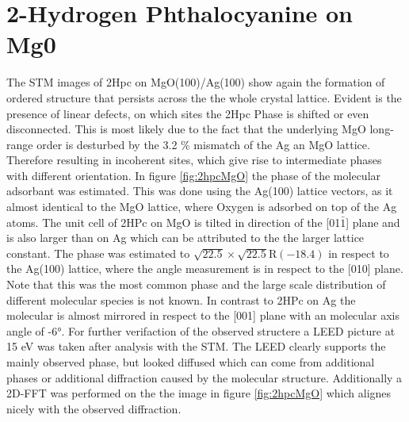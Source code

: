 \newpage
\section{2-Hydrogen Phthalocyanine on Mg0}
The STM images of 2Hpc on MgO(100)/Ag(100) show again the formation of ordered structure that persists across the the whole crystal lattice.
Evident is the presence of linear defects, on which sites the 2Hpc Phase is shifted or even disconnected. 
This is most likely due to the fact that the underlying MgO long-range order is desturbed by the 3.2 \% mismatch of the Ag an MgO lattice.
Therefore resulting in incoherent sites, which give rise to intermediate phases with different orientation.
In figure \ref{fig:2hpcMgO} the phase of the molecular adsorbant was estimated.
This was done using the Ag(100) lattice vectors, as it almost identical to the MgO lattice, where Oxygen is adsorbed on top of the Ag atoms.
The unit cell of 2HPc on MgO is tilted in direction of the [01$\bar{1}$] plane and is also larger than on Ag which can be attributed to the the larger lattice constant.
The phase was estimated to $\sqrt{22.5} \times  \sqrt{22.5}\text{R}(-18.4)$ in respect to the Ag(100) lattice, where the angle measurement is in respect to the [010] plane.
Note that this was the most common phase and the large scale distribution of different molecular species is not known.
In contrast to 2HPc on Ag the molecular is almost mirrored in respect to the [001] plane with an molecular axis angle of -6°.
\noindent
For further verifaction of the observed structere a LEED picture at 15 eV was taken after analysis with the STM.
The LEED clearly supports the mainly observed phase, but looked diffused which can come from additional phases or additional diffraction caused by the molecular structure.
Additionally a 2D-FFT was performed on the the image in figure \ref{fig:2hpcMgO} which alignes nicely with the observed diffraction.

